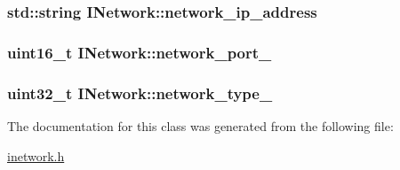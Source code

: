 \subsubsection[{\texorpdfstring{network\+\_\+ip\+\_\+address}{network_ip_address}}]{\setlength{\rightskip}{0pt plus 5cm}std\+::string I\+Network\+::network\+\_\+ip\+\_\+address\hspace{0.3cm}{\ttfamily [protected]}}\hypertarget{classINetwork_a17f3c5cfeede0a839162320cb0bdd042}{}\label{classINetwork_a17f3c5cfeede0a839162320cb0bdd042}
\subsubsection[{\texorpdfstring{network\+\_\+port\+\_\+}{network_port_}}]{\setlength{\rightskip}{0pt plus 5cm}uint16\+\_\+t I\+Network\+::network\+\_\+port\+\_\+\hspace{0.3cm}{\ttfamily [protected]}}\hypertarget{classINetwork_adde67598162e5b350454a49c9136c500}{}\label{classINetwork_adde67598162e5b350454a49c9136c500}
\subsubsection[{\texorpdfstring{network\+\_\+type\+\_\+}{network_type_}}]{\setlength{\rightskip}{0pt plus 5cm}uint32\+\_\+t I\+Network\+::network\+\_\+type\+\_\+\hspace{0.3cm}{\ttfamily [protected]}}\hypertarget{classINetwork_ac427f5a6bf1e2b9b375c12d839d4f11f}{}\label{classINetwork_ac427f5a6bf1e2b9b375c12d839d4f11f}


The documentation for this class was generated from the following file\+:\begin{DoxyCompactItemize}
\item 
\hyperlink{inetwork_8h}{inetwork.\+h}\end{DoxyCompactItemize}
